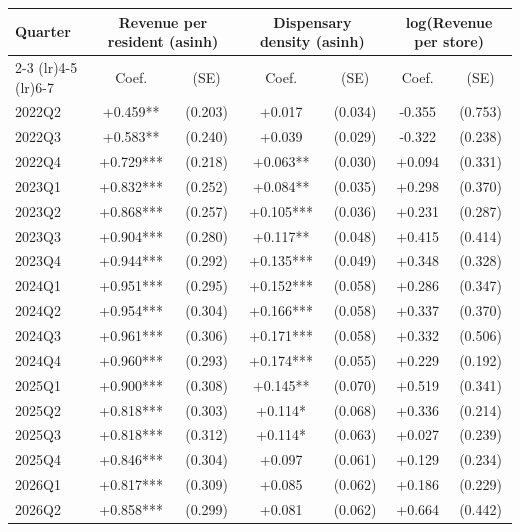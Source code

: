 \begin{tabular}{@{}lcccccc@{}}
\toprule
Quarter & \multicolumn{2}{c}{Revenue per resident (asinh)} & \multicolumn{2}{c}{Dispensary density (asinh)} & \multicolumn{2}{c}{log(Revenue per store)} \\
\cmidrule(lr){2-3} \cmidrule(lr){4-5} \cmidrule(lr){6-7}
& Coef. & (SE) & Coef. & (SE) & Coef. & (SE) \\
\midrule
2022Q2 & +0.459** & (0.203) & +0.017 & (0.034) & -0.355 & (0.753) \\
2022Q3 & +0.583** & (0.240) & +0.039 & (0.029) & -0.322 & (0.238) \\
2022Q4 & +0.729*** & (0.218) & +0.063** & (0.030) & +0.094 & (0.331) \\
2023Q1 & +0.832*** & (0.252) & +0.084** & (0.035) & +0.298 & (0.370) \\
2023Q2 & +0.868*** & (0.257) & +0.105*** & (0.036) & +0.231 & (0.287) \\
2023Q3 & +0.904*** & (0.280) & +0.117** & (0.048) & +0.415 & (0.414) \\
2023Q4 & +0.944*** & (0.292) & +0.135*** & (0.049) & +0.348 & (0.328) \\
2024Q1 & +0.951*** & (0.295) & +0.152*** & (0.058) & +0.286 & (0.347) \\
2024Q2 & +0.954*** & (0.304) & +0.166*** & (0.058) & +0.337 & (0.370) \\
2024Q3 & +0.961*** & (0.306) & +0.171*** & (0.058) & +0.332 & (0.506) \\
2024Q4 & +0.960*** & (0.293) & +0.174*** & (0.055) & +0.229 & (0.192) \\
2025Q1 & +0.900*** & (0.308) & +0.145** & (0.070) & +0.519 & (0.341) \\
2025Q2 & +0.818*** & (0.303) & +0.114* & (0.068) & +0.336 & (0.214) \\
2025Q3 & +0.818*** & (0.312) & +0.114* & (0.063) & +0.027 & (0.239) \\
2025Q4 & +0.846*** & (0.304) & +0.097 & (0.061) & +0.129 & (0.234) \\
2026Q1 & +0.817*** & (0.309) & +0.085 & (0.062) & +0.186 & (0.229) \\
2026Q2 & +0.858*** & (0.299) & +0.081 & (0.062) & +0.664 & (0.442) \\
\bottomrule
\end{tabular}
